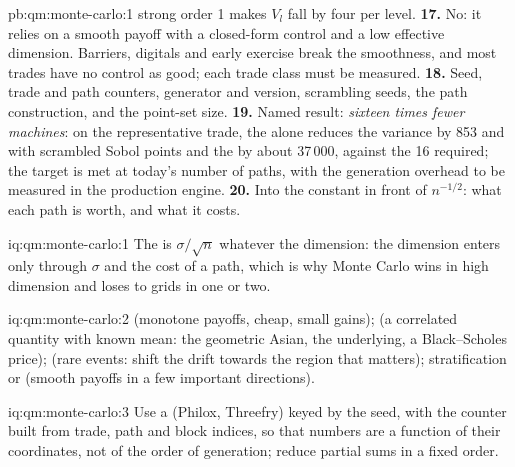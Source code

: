 \begin{solution}{pb:qm:monte-carlo:1}
strong order 1 makes $V_l$ fall by four per level.
\textbf{17.} No: it relies on a smooth payoff with a closed-form control and a low effective dimension. Barriers, digitals and early exercise break the smoothness, and most trades have no control
as good; each trade class must be measured.
\textbf{18.} Seed, trade and path counters, generator and version, scrambling seeds, the path construction, and the point-set size.
\textbf{19.} Named result: \emph{sixteen times fewer machines}: on the representative trade, the  alone reduces the variance by 853 and with scrambled Sobol points and the  by about
37\,000, against the 16 required; the target is met at today's number of paths, with the generation overhead to be measured in the production engine.
\textbf{20.} Into the constant in front of $n^{-1/2}$: what each path is worth, and what it costs.
\end{solution}

\begin{solution}{iq:qm:monte-carlo:1}
The  is $\sigma/\sqrt n$ whatever the dimension: the dimension enters only through $\sigma$ and the cost of a path, which is why Monte Carlo wins in high dimension and loses to grids in one or two.
\end{solution}

\begin{solution}{iq:qm:monte-carlo:2}
 (monotone payoffs, cheap, small gains);  (a correlated quantity with known mean: the geometric Asian, the underlying, a Black--Scholes price); 
(rare events: shift the drift towards the region that matters); stratification or  (smooth payoffs in a few important directions).
\end{solution}

\begin{solution}{iq:qm:monte-carlo:3}
Use a  (Philox, Threefry) keyed by the seed, with the counter built from trade, path and block indices, so that numbers are a function of their coordinates, not of the order
of generation; reduce partial sums in a fixed order.
\end{solution}

